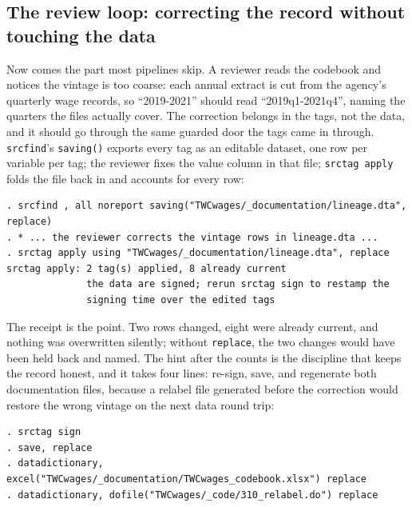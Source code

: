\documentclass[
    a4paper,
    fontsize=10pt,
    twoside=true,
    numbers=noenddot,
]{kaobook}
\begin{document}
\subsection{The review loop: correcting the record without touching the data}
Now comes the part most pipelines skip. A reviewer reads the codebook and notices the vintage is too coarse: each annual extract is cut from the agency's quarterly wage records, so \enquote{2019-2021} should read \enquote{2019q1-2021q4}, naming the quarters the files actually cover. The correction belongs in the tags, not the data, and it should go through the same guarded door the tags came in through. \texttt{srcfind}'s \texttt{saving()} exports every tag as an editable dataset, one row per variable per tag; the reviewer fixes the value column in that file; \texttt{srctag apply} folds the file back in and accounts for every row:
\par
{\footnotesize
\begin{verbatim}
. srcfind , all noreport saving("TWCwages/_documentation/lineage.dta", replace)
. * ... the reviewer corrects the vintage rows in lineage.dta ...
. srctag apply using "TWCwages/_documentation/lineage.dta", replace
srctag apply: 2 tag(s) applied, 8 already current
              the data are signed; rerun srctag sign to restamp the
              signing time over the edited tags
\end{verbatim}
}
The receipt is the point. Two rows changed, eight were already current, and nothing was overwritten silently; without \texttt{replace}, the two changes would have been held back and named. The hint after the counts is the discipline that keeps the record honest, and it takes four lines: re-sign, save, and regenerate both documentation files, because a relabel file generated before the correction would restore the wrong vintage on the next data round trip:
\par
{\footnotesize
\begin{verbatim}
. srctag sign
. save, replace
. datadictionary, excel("TWCwages/_documentation/TWCwages_codebook.xlsx") replace
. datadictionary, dofile("TWCwages/_code/310_relabel.do") replace
\end{verbatim}
}
\end{document}
